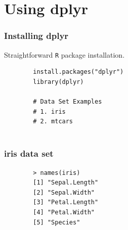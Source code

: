 \documentclass{beamer}
\begin{document}
\section{Using dplyr}
\begin{frame}[fragile]
	\frametitle{Installing dplyr}
	\LARGE
	Straightforward \texttt{R} package installation.
	\begin{framed}
		\begin{verbatim}
		install.packages("dplyr")
		library(dplyr)
		
		# Data Set Examples
		# 1. iris
		# 2. mtcars
		
		\end{verbatim}
	\end{framed}
\end{frame}

\begin{frame}[fragile]
	\frametitle{iris data set}
	\LARGE
	\begin{framed}
		\begin{verbatim}
		> names(iris)
		[1] "Sepal.Length"
		[2] "Sepal.Width" 
		[3] "Petal.Length"
		[4] "Petal.Width" 
		[5] "Species"    
		\end{verbatim}
	\end{framed}
\end{frame}
\end{document}
